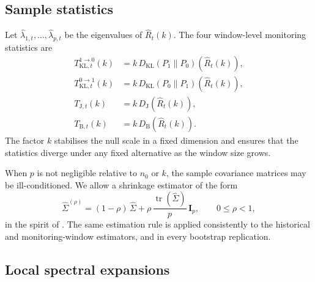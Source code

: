 \documentclass[11pt,a4paper]{article}
\DeclareMathOperator{\tr}{tr}
\newcommand{\I}{\mathbf{I}}
\newcommand{\KL}{\mathrm{KL}}
\newcommand{\J}{\mathrm{J}}
\newcommand{\Bhat}{\mathrm{B}}
\begin{document}
\subsection{Sample statistics}

Let $\widehat{\lambda}_{1,t},\ldots,\widehat{\lambda}_{p,t}$ be the eigenvalues
of $\widehat{R}_{t}(k)$.  The four window-level monitoring statistics are
\begin{align}
T_{\KL,t}^{1\to 0}(k) &= k\,D_{\KL}(P_{1}\|P_{0})\!\left(\widehat{R}_{t}(k)\right),
\label{eq:Tklr}\\
T_{\KL,t}^{0\to 1}(k) &= k\,D_{\KL}(P_{0}\|P_{1})\!\left(\widehat{R}_{t}(k)\right),
\label{eq:Tklf}\\
T_{\J,t}(k) &= k\,D_{\J}\!\left(\widehat{R}_{t}(k)\right),
\label{eq:Tj}\\
T_{\Bhat,t}(k) &= k\,D_{\Bhat}\!\left(\widehat{R}_{t}(k)\right).
\label{eq:Tb}
\end{align}
The factor $k$ stabilises the null scale in a fixed dimension and ensures that
the statistics diverge under any fixed alternative as the window size grows.

When $p$ is not negligible relative to $n_{0}$ or $k$, the sample covariance
matrices may be ill-conditioned.  We allow a shrinkage estimator of the form
\begin{equation}
\widehat{\Sigma}^{(\rho)}
= (1-\rho)\,\widehat{\Sigma}
  + \rho\,\frac{\tr(\widehat{\Sigma})}{p}\,\I_{p},
\qquad 0\leq\rho<1,
\label{eq:shrinkage}
\end{equation}
in the spirit of \citet{ledoitwolf2004}.  The same estimation rule is applied
consistently to the historical and monitoring-window estimators, and in every
bootstrap replication.

\subsection{Local spectral expansions} \label{sec:local}
\end{document}
